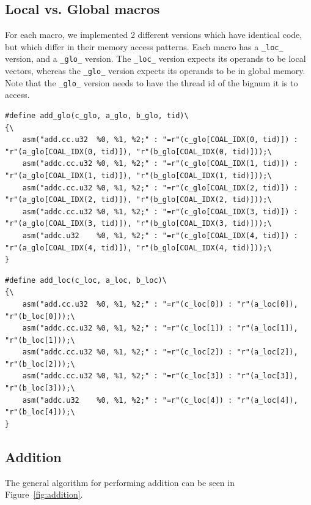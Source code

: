 \documentclass[12pt, a4paper]{report}
\begin{document}
\subsection{Local vs. Global macros}
For each macro, we implemented 2 different versions which have identical code,
but which differ in their memory access patterns.
Each macro has a \verb+_loc_+ version, and a \verb+_glo_+ version.
The \verb+_loc_+ version expects its operands to be local vectors, whereas
the \verb+_glo_+ version expects its operands to be in global memory.
Note that the \verb+_glo_+ version needs to have the thread id of the bignum it
is to access.

\begin{lstlisting}
#define add_glo(c_glo, a_glo, b_glo, tid)\
{\
    asm("add.cc.u32  %0, %1, %2;" : "=r"(c_glo[COAL_IDX(0, tid)]) : "r"(a_glo[COAL_IDX(0, tid)]), "r"(b_glo[COAL_IDX(0, tid)]));\
    asm("addc.cc.u32 %0, %1, %2;" : "=r"(c_glo[COAL_IDX(1, tid)]) : "r"(a_glo[COAL_IDX(1, tid)]), "r"(b_glo[COAL_IDX(1, tid)]));\
    asm("addc.cc.u32 %0, %1, %2;" : "=r"(c_glo[COAL_IDX(2, tid)]) : "r"(a_glo[COAL_IDX(2, tid)]), "r"(b_glo[COAL_IDX(2, tid)]));\
    asm("addc.cc.u32 %0, %1, %2;" : "=r"(c_glo[COAL_IDX(3, tid)]) : "r"(a_glo[COAL_IDX(3, tid)]), "r"(b_glo[COAL_IDX(3, tid)]));\
    asm("addc.u32    %0, %1, %2;" : "=r"(c_glo[COAL_IDX(4, tid)]) : "r"(a_glo[COAL_IDX(4, tid)]), "r"(b_glo[COAL_IDX(4, tid)]));\
}
\end{lstlisting}

\begin{lstlisting}
#define add_loc(c_loc, a_loc, b_loc)\
{\
    asm("add.cc.u32  %0, %1, %2;" : "=r"(c_loc[0]) : "r"(a_loc[0]), "r"(b_loc[0]));\
    asm("addc.cc.u32 %0, %1, %2;" : "=r"(c_loc[1]) : "r"(a_loc[1]), "r"(b_loc[1]));\
    asm("addc.cc.u32 %0, %1, %2;" : "=r"(c_loc[2]) : "r"(a_loc[2]), "r"(b_loc[2]));\
    asm("addc.cc.u32 %0, %1, %2;" : "=r"(c_loc[3]) : "r"(a_loc[3]), "r"(b_loc[3]));\
    asm("addc.u32    %0, %1, %2;" : "=r"(c_loc[4]) : "r"(a_loc[4]), "r"(b_loc[4]));\
}
\end{lstlisting}

\subsection{Addition}
The general algorithm for performing addition can be seen in
Figure~\ref{fig:addition}.
\end{document}
